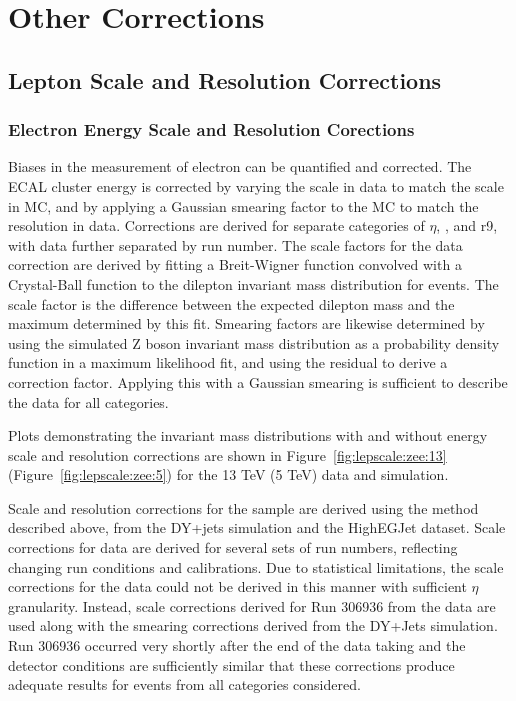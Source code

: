 \chapter{Other Corrections}\label{ch:corrs}
\section{Lepton Scale and Resolution Corrections}

\subsection{Electron Energy Scale and Resolution Corections}
Biases in the measurement of electron \et can be quantified and corrected. The ECAL cluster energy is corrected by varying the scale in data to match the scale in MC, and by applying a Gaussian smearing factor to the MC to match the resolution in data. Corrections are derived for separate categories of $\eta$, \et, and r9, with data further separated by run number. The scale factors for the data correction are derived by fitting a Breit-Wigner function convolved with a Crystal-Ball function to the dilepton invariant mass distribution for \zee events. The scale factor is the difference between the expected dilepton mass and the maximum determined by this fit. Smearing factors are likewise determined by using the simulated Z boson invariant mass distribution as a probability density function in a maximum likelihood fit, and using the residual to derive a correction factor. Applying this with a Gaussian smearing is sufficient to describe the data for all categories. \cite{Khachatryan:2015iwa}

Plots demonstrating the \zee invariant mass distributions with and without energy scale and resolution corrections are shown in Figure~\ref{fig:lepscale:zee:13} (Figure~\ref{fig:lepscale:zee:5}) for the 13 TeV (5 TeV) data and simulation. 




Scale and resolution corrections for the \serah sample are derived using the method described above, from the DY+jets simulation and the HighEGJet dataset. Scale corrections for data are derived for several sets of run numbers, reflecting changing run conditions and calibrations. Due to statistical limitations, the scale corrections for the \serag data could not be derived in this manner with sufficient $\eta$ granularity. Instead, scale corrections derived for Run 306936 from the \serah data are used along with the smearing corrections derived from the \serah DY+Jets simulation. Run 306936 occurred very shortly after the end of the \serag data taking and the detector conditions are sufficiently similar that these corrections produce adequate results for events from all categories considered.

